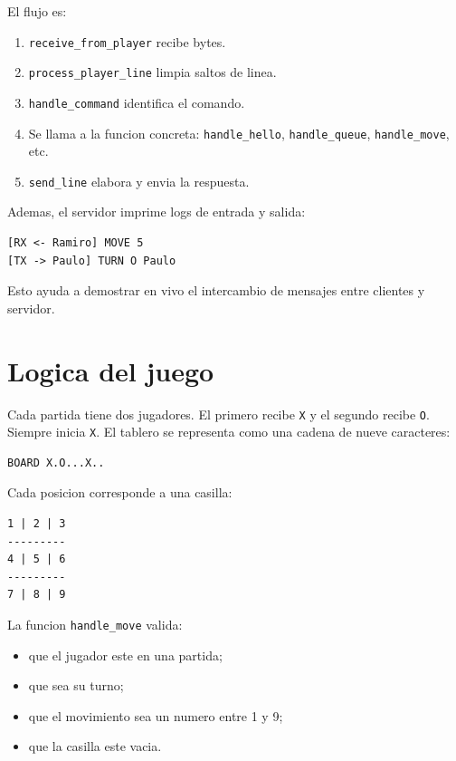 \documentclass[12pt,a4paper]{article}
\begin{document}
El flujo es:

\begin{enumerate}
    \item \texttt{receive\_from\_player} recibe bytes.
    \item \texttt{process\_player\_line} limpia saltos de linea.
    \item \texttt{handle\_command} identifica el comando.
    \item Se llama a la funcion concreta: \texttt{handle\_hello},
    \texttt{handle\_queue}, \texttt{handle\_move}, etc.
    \item \texttt{send\_line} elabora y envia la respuesta.
\end{enumerate}

Ademas, el servidor imprime logs de entrada y salida:

\begin{lstlisting}[style=code]
[RX <- Ramiro] MOVE 5
[TX -> Paulo] TURN O Paulo
\end{lstlisting}

Esto ayuda a demostrar en vivo el intercambio de mensajes entre clientes y
servidor.

\section{Logica del juego}

Cada partida tiene dos jugadores. El primero recibe \texttt{X} y el segundo
recibe \texttt{O}. Siempre inicia \texttt{X}. El tablero se representa como una
cadena de nueve caracteres:

\begin{lstlisting}[style=code]
BOARD X.O...X..
\end{lstlisting}

Cada posicion corresponde a una casilla:

\begin{lstlisting}[style=code]
1 | 2 | 3
---------
4 | 5 | 6
---------
7 | 8 | 9
\end{lstlisting}

La funcion \texttt{handle\_move} valida:

\begin{itemize}
    \item que el jugador este en una partida;
    \item que sea su turno;
    \item que el movimiento sea un numero entre 1 y 9;
    \item que la casilla este vacia.
\end{itemize}
\end{document}
